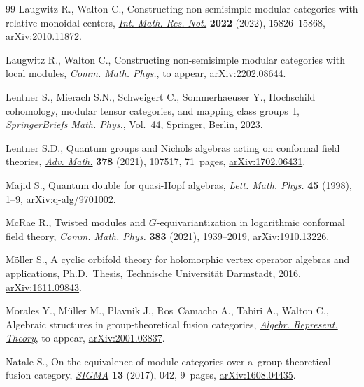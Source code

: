 \documentclass[pdftex]{sigma}
\numberwithin{equation}{section}
\begin{document}
\begin{thebibliography}{99}
Laugwitz R., Walton C., Constructing non-semisimple modular categories with
 relative monoidal centers, \href{https://doi.org/10.1093/imrn/rnab097}{\textit{Int. Math. Res. Not.}} \textbf{2022}
 (2022), 15826--15868, \href{https://arxiv.org/abs/2010.11872}{arXiv:2010.11872}.

Laugwitz R., Walton C., Constructing non-semisimple modular categories with
 local modules, \href{https://doi.org/10.1007/s00220-023-04824-4}{\textit{Comm. Math. Phys.}}, {t}o appear, \href{https://arxiv.org/abs/2202.08644}{arXiv:2202.08644}.

Lentner S., Mierach S.N., Schweigert C., Sommerhaeuser Y., Hochschild
 cohomology, modular tensor categories, and mapping class groups~{I},
 \textit{SpringerBriefs Math. Phys.}, Vol.~44, \href{https://doi.org/10.1007/978-981-19-4645-5}{Springer}, Berlin, 2023.

Lentner S.D., Quantum groups and {N}ichols algebras acting on conformal field
 theories, \href{https://doi.org/10.1016/j.aim.2020.107517}{\textit{Adv. Math.}} \textbf{378} (2021), 107517, 71~pages,
 \href{https://arxiv.org/abs/1702.06431}{arXiv:1702.06431}.

Majid S., Quantum double for quasi-{H}opf algebras, \href{https://doi.org/10.1023/A:1007450123281}{\textit{Lett. Math. Phys.}}
 \textbf{45} (1998), 1--9, \href{https://arxiv.org/abs/q-alg/9701002}{arXiv:q-alg/9701002}.

McRae R., Twisted modules and {$G$}-equivariantization in logarithmic conformal
 field theory, \href{https://doi.org/10.1007/s00220-020-03882-2}{\textit{Comm. Math. Phys.}} \textbf{383} (2021), 1939--2019,
 \href{https://arxiv.org/abs/1910.13226}{arXiv:1910.13226}.

M\"oller S., A cyclic orbifold theory for holomorphic vertex operator algebras
 and applications, Ph.D.~Thesis, {T}echnische Universit{\"a}t Darmstadt, 2016,
 \href{https://arxiv.org/abs/1611.09843}{arXiv:1611.09843}.

Morales Y., M\"uller M., Plavnik J., Ros~Camacho A., Tabiri A., Walton C.,
 Algebraic structures in group-theoretical fusion categories, \href{https://doi.org/10.1007/s10468-022-10186-7}{\textit{Algebr.
 Represent. Theory}}, {t}o appear, \href{https://arxiv.org/abs/2001.03837}{arXiv:2001.03837}.

Natale S., On the equivalence of module categories over a~group-theoretical
 fusion category, \href{https://doi.org/10.3842/SIGMA.2017.042}{\textit{SIGMA}} \textbf{13} (2017), 042, 9~pages,
 \href{https://arxiv.org/abs/1608.04435}{arXiv:1608.04435}.


\end{thebibliography}
\end{document}
